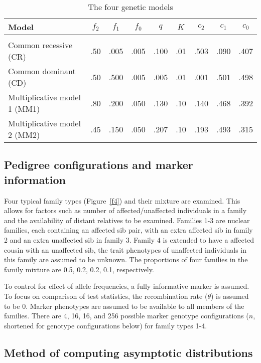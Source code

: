 \begin{table}[h]
\centering
\caption{The four genetic models\label{models2}}
\begin{tabular}{lcccccccc}
\\
\hline
Model             & $f_2$ & $f_1$ & $f_0$ & $q$ & $K$ & $c_2$ & $c_1$ & $c_0$\\
\hline
\\
Common recessive (CR) & .50 &  .005 & .005 & .100 & .01 &  .503 & .090 & .407\\
Common dominant (CD) & .50 &  .500 & .005 & .005 & .01 &  .001 & .501 & .498\\
Multiplicative model 1 (MM1) &   .80 &  .200 & .050 & .130 & .10 &  .140 & .468 & .392\\
Multiplicative model 2 (MM2) &   .45 &  .150 & .050 & .207 & .10 &  .193 & .493 & .315\\
\hline
\end{tabular}
\end{table}

\subsection*{Pedigree configurations and marker information}

Four typical family types (Figure~\ref{f4}) and their mixture are examined.
This allows for factors such as number of affected/unaffected individuals in a
family and the availability of distant relatives to be examined.  Families 1-3
are nuclear families, each containing an affected sib pair, with an extra
affected sib in family 2 and an extra unaffected sib in family 3.  Family 4 is
extended to have a affected cousin with an unaffected sib, the trait phenotypes
of unaffected individuals in this family are assumed to be unknown.  The
proportions of four families in the family mixture are 0.5, 0.2, 0.2, 0.1,
respectively.

To control for effect of allele frequencies, a fully informative marker is
assumed.  To focus on comparison of test statistics, the recombination rate
($\theta$) is assumed to be 0.  Marker phenotypes are assumed to be available
to all members of the families.  There are 4, 16, 16, and 256 possible marker
genotype configurations ($n$, shortened for genotype configurations below) for
family types 1-4.

\subsection*{Method of computing asymptotic distributions}

